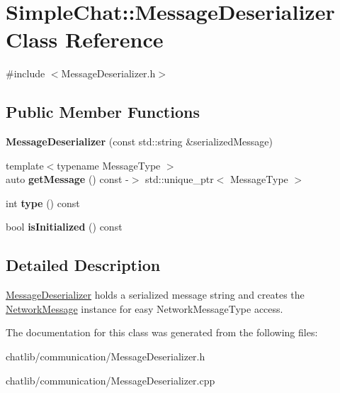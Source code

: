 \hypertarget{classSimpleChat_1_1MessageDeserializer}{\section{Simple\-Chat\-:\-:Message\-Deserializer Class Reference}
\label{classSimpleChat_1_1MessageDeserializer}
}


{\ttfamily \#include $<$Message\-Deserializer.\-h$>$}

\subsection*{Public Member Functions}
\begin{DoxyCompactItemize}
\item 
\hypertarget{classSimpleChat_1_1MessageDeserializer_a4830e7b720a6e27ed79cd1a2cd2e145c}{{\bfseries Message\-Deserializer} (const std\-::string \&serialized\-Message)}\label{classSimpleChat_1_1MessageDeserializer_a4830e7b720a6e27ed79cd1a2cd2e145c}

\item 
\hypertarget{classSimpleChat_1_1MessageDeserializer_a25016edab8dd43a98bf04daac134324e}{{\footnotesize template$<$typename Message\-Type $>$ }\\auto {\bfseries get\-Message} () const -\/$>$ std\-::unique\-\_\-ptr$<$ Message\-Type $>$}\label{classSimpleChat_1_1MessageDeserializer_a25016edab8dd43a98bf04daac134324e}

\item 
\hypertarget{classSimpleChat_1_1MessageDeserializer_a76bc3ce73deaf4e1b71230d2c9a51130}{int {\bfseries type} () const }\label{classSimpleChat_1_1MessageDeserializer_a76bc3ce73deaf4e1b71230d2c9a51130}

\item 
\hypertarget{classSimpleChat_1_1MessageDeserializer_a1a6b55d2c3d3e6a4a8d1e68c4a0b3c19}{bool {\bfseries is\-Initialized} () const }\label{classSimpleChat_1_1MessageDeserializer_a1a6b55d2c3d3e6a4a8d1e68c4a0b3c19}

\end{DoxyCompactItemize}


\subsection{Detailed Description}
\hyperlink{classSimpleChat_1_1MessageDeserializer}{Message\-Deserializer} holds a serialized message string and creates the \hyperlink{classSimpleChat_1_1NetworkMessage}{Network\-Message} instance for easy Network\-Message\-Type access. 

The documentation for this class was generated from the following files\-:\begin{DoxyCompactItemize}
\item 
chatlib/communication/Message\-Deserializer.\-h\item 
chatlib/communication/Message\-Deserializer.\-cpp\end{DoxyCompactItemize}
